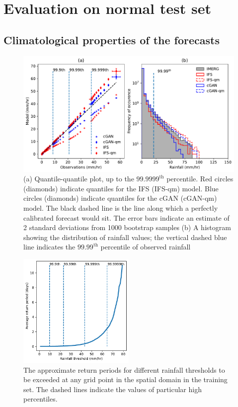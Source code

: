 \documentclass{article}
\begin{document}
\section{Evaluation on normal test set}

\label{sec:eval_normal}

\subsection{Climatological properties of the forecasts}
\label{sec:climatologic}
\begin{figure}
     \centering
     \includegraphics[width=\textwidth]{images/q-q_hist_final-nologs_217600_all.pdf}

     \caption{(a) Quantile-quantile plot, up to the $99.9999^{\text{th}}$ percentile. Red circles (diamonds) indicate quantiles for the IFS (IFS-qm) model. Blue circles (diamonds) indicate quantiles for the cGAN (cGAN-qm) model. The black dashed line is the line along which a perfectly calibrated forecast would sit. The error bars indicate an estimate of 2 standard deviations from 1000 bootstrap samples (b) A histogram showing the distribution of rainfall values; the vertical dashed blue line indicates the $99.99^{\text{th}}$ percentile of observed rainfall }
     \label{fig:qq_hist}
\end{figure}

\begin{figure}
     \centering
     \includegraphics[width=0.5\textwidth]{images/return_periods_train.pdf}

    \caption{The approximate return periods for different rainfall thresholds to be exceeded at any grid point in the spatial domain in the training set. The dashed lines indicate the values of particular high percentiles.}
    \label{fig:return}
\end{figure}
\end{document}
